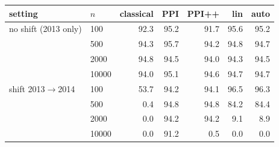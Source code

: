 \begin{tabular}{ll rrrrr}
\toprule
setting & $n$ & classical & PPI & PPI++ & lin & auto\\
\midrule
no shift (2013 only) & 100 & 92.3 & 95.2 & 91.7 & 95.6 & 95.2\\
 & 500 & 94.3 & 95.7 & 94.2 & 94.8 & 94.7\\
 & 2000 & 94.8 & 94.5 & 94.0 & 94.3 & 94.5\\
 & 10000 & 94.0 & 95.1 & 94.6 & 94.7 & 94.7\\
\midrule
shift 2013$\to$2014 & 100 & 53.7 & 94.2 & 94.1 & 96.5 & 96.3\\
 & 500 & 0.4 & 94.8 & 94.8 & 84.2 & 84.4\\
 & 2000 & 0.0 & 94.2 & 94.2 & 9.1 & 8.9\\
 & 10000 & 0.0 & 91.2 & 0.5 & 0.0 & 0.0\\
\bottomrule
\end{tabular}